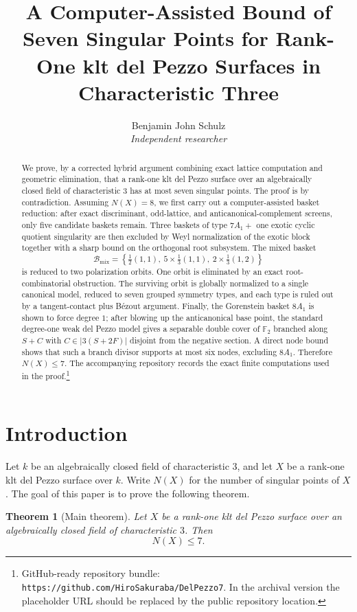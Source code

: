 \documentclass[11pt]{article}
\title{A Computer-Assisted Bound of Seven Singular Points for Rank-One klt del Pezzo Surfaces in Characteristic Three}
\author{Benjamin John Schulz\\[4pt]\small\textit{Independent researcher}}
\date{}
\newcommand{\repourl}{\texttt{https://github.com/HiroSakuraba/DelPezzo7}}
\newtheorem{theorem}{Theorem}[section]
\theoremstyle{definition}
\begin{document}
\maketitle

\begin{abstract}
We prove, by a corrected hybrid argument combining exact lattice computation and geometric elimination, that a rank-one klt del Pezzo surface over an algebraically closed field of characteristic $3$ has at most seven singular points. The proof is by contradiction. Assuming $N(X)=8$, we first carry out a computer-assisted basket reduction: after exact discriminant, odd-lattice, and anticanonical-complement screens, only five candidate baskets remain. Three baskets of type $7A_1+$ one exotic cyclic quotient singularity are then excluded by Weyl normalization of the exotic block together with a sharp bound on the orthogonal root subsystem. The mixed basket
\[
\mathcal B_{\mathrm{mix}}=\left\{\tfrac12(1,1),\ 5\times\tfrac13(1,1),\ 2\times\tfrac13(1,2)\right\}
\]
is reduced to two polarization orbits. One orbit is eliminated by an exact root-combinatorial obstruction. The surviving orbit is globally normalized to a single canonical model, reduced to seven grouped symmetry types, and each type is ruled out by a tangent-contact plus B\'ezout argument. Finally, the Gorenstein basket $8A_1$ is shown to force degree $1$; after blowing up the anticanonical base point, the standard degree-one weak del Pezzo model gives a separable double cover of $\mathbb F_2$ branched along $S+C$ with $C\in |3(S+2F)|$ disjoint from the negative section. A direct node bound shows that such a branch divisor supports at most six nodes, excluding $8A_1$. Therefore $N(X)\le 7$. The accompanying repository records the exact finite computations used in the proof.\footnote{GitHub-ready repository bundle: \repourl. In the archival version the placeholder URL should be replaced by the public repository location.}
\end{abstract}

\tableofcontents

\section{Introduction}
Let $k$ be an algebraically closed field of characteristic $3$, and let $X$ be a rank-one klt del Pezzo surface over $k$. Write $N(X)$ for the number of singular points of $X$. The goal of this paper is to prove the following theorem.

\begin{theorem}[Main theorem]\label{thm:main}
Let $X$ be a rank-one klt del Pezzo surface over an algebraically closed field of characteristic $3$. Then
\[
N(X)\le 7.
\]
\end{theorem}
\end{document}
